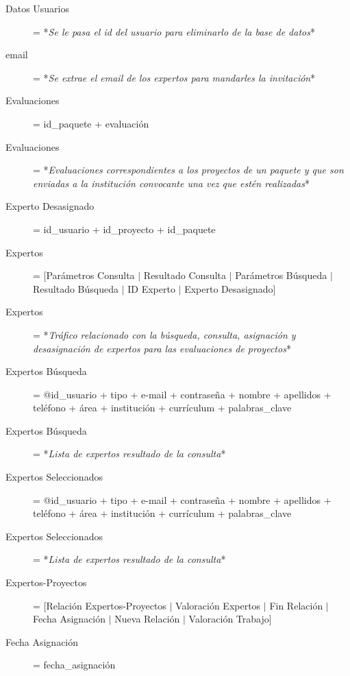 \documentclass[12pt,a4paper,titlepage,spanish,twoside]{book}
\begin{document}
\begin{description}
\item[Datos Usuarios] = *\emph{Se le pasa el id del usuario para eliminarlo
    de la base de datos}* 

\item[email] = *\emph{Se extrae el email de los expertos para mandarles la
    invitación}* 

\item[Evaluaciones] = id\_paquete + {evaluación}

\item[Evaluaciones] = *\emph{Evaluaciones correspondientes a los proyectos de
    un paquete y que son enviadas a la institución convocante una vez que
    estén realizadas}* 

\item[Experto Desasignado] = id\_usuario + id\_proyecto + id\_paquete

\item[Expertos] = [Parámetros Consulta $\mid$ Resultado Consulta $\mid$
  Parámetros Búsqueda $\mid$ Resultado Búsqueda $\mid$ ID Experto $\mid$
  Experto Desasignado] 

\item[Expertos] = *\emph{Tráfico relacionado con la búsqueda, consulta,
    asignación y desasignación de expertos para las evaluaciones de
    proyectos}* 

\item[Expertos Búsqueda] = {@id\_usuario + tipo + e-mail + contraseña +
    nombre + apellidos + teléfono + área + institución + currículum +
    {palabras\_clave}} 

\item[Expertos Búsqueda] = *\emph{Lista de expertos resultado de la
    consulta}* 

\item[Expertos Seleccionados] = {@id\_usuario + tipo + e-mail + contraseña +
    nombre + apellidos + teléfono + área + institución + currículum +
    {palabras\_clave}} 

\item[Expertos Seleccionados] = *\emph{Lista de expertos resultado de la
    consulta}* 

\item[Expertos-Proyectos] = [Relación Expertos-Proyectos $\mid$ Valoración
  Expertos $\mid$ Fin Relación $\mid$ Fecha Asignación $\mid$ Nueva Relación
  $\mid$ Valoración Trabajo] 

\item[Fecha Asignación] = fecha\_asignación


\end{description}
\end{document}
